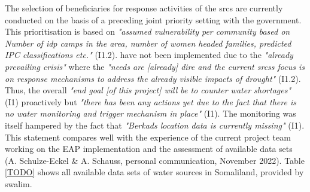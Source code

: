The selection of beneficiaries for response activities of the \acrshort*{srcs} are currently conducted on the basis of a preceding joint priority setting with the government. This prioritisation is based on \textit{"assumed vulnerability per community based on Number of \acrfull{idp} camps in the area, number of women headed families, predicted IPC classifications etc."} (I1.2).  have not been implemented due to the \textit{"already prevailing crisis"} where the \textit{"needs are [already] dire and the current \acrshort*{srcs}s focus is on response mechanisms to address the already visible impacts of drought"} (I1.2). Thus, the overall \textit{"end goal [of this project] will be to counter water shortages"} (I1) proactively but \textit{"there has been any actions yet due to the fact that there is no water monitoring and trigger mechanism in place"} (I1). The monitoring was itself hampered by the fact that \textit{"Berkads location data is currently missing"} (I1). This statement compares well with the experience of the current project team working on the EAP implementation and the assessment of available data sets (A. Schulze-Eckel \& A. Schauss, personal communication, November 2022).\newline
Table \ref*{TODO} shows all available data sets of water sources in Somaliland, provided by \acrshort*{swalim}. %


